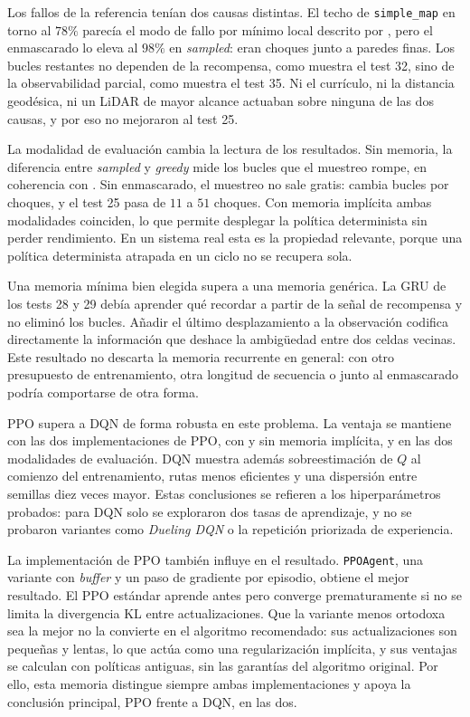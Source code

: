 Los fallos de la referencia tenían dos causas distintas. El
techo de \texttt{simple\_map} en torno al $78\%$ parecía el modo de
fallo por mínimo local descrito por \citet{gao2025hierarchical}, pero el
enmascarado lo eleva al $98\%$ en \textit{sampled}: eran choques junto a
paredes finas. Los bucles restantes no dependen de la recompensa, como
muestra el test 32, sino de la observabilidad parcial, como muestra el
test 35. Ni el currículo, ni la distancia geodésica, ni un LiDAR de
mayor alcance actuaban sobre ninguna de las dos causas, y por eso no
mejoraron al test 25.

La modalidad de evaluación cambia la lectura de los resultados.
Sin memoria, la diferencia entre \textit{sampled} y \textit{greedy} mide
los bucles que el muestreo rompe, en coherencia con
\citet{singh1994learning}. Sin enmascarado, el muestreo no sale gratis:
cambia bucles por choques, y el test 25 pasa de $11$ a $51$ choques. Con
memoria implícita ambas modalidades coinciden, lo que permite desplegar
la política determinista sin perder rendimiento. En un sistema real esta
es la propiedad relevante, porque una política determinista atrapada en
un ciclo no se recupera sola.

Una memoria mínima bien elegida supera a una memoria genérica.
La GRU de los tests 28 y 29 debía aprender qué recordar a partir de la
señal de recompensa y no eliminó los bucles. Añadir el último
desplazamiento a la observación codifica directamente la información que
deshace la ambigüedad entre dos celdas vecinas. Este resultado no
descarta la memoria recurrente en general: con otro presupuesto de
entrenamiento, otra longitud de secuencia o junto al enmascarado podría
comportarse de otra forma.

PPO supera a DQN de forma robusta en este problema. La ventaja
se mantiene con las dos implementaciones de PPO, con y sin memoria
implícita, y en las dos modalidades de evaluación. DQN muestra además
sobreestimación de $Q$ al comienzo del entrenamiento, rutas menos
eficientes y una dispersión entre semillas diez veces mayor. Estas
conclusiones se refieren a los hiperparámetros probados: para DQN solo se
exploraron dos tasas de aprendizaje, y no se probaron variantes como
\textit{Dueling DQN} o la repetición priorizada de experiencia.

La implementación de PPO también influye en el resultado.
\texttt{PPOAgent}, una variante
con \textit{buffer} y un paso de gradiente por episodio, obtiene el mejor
resultado. El PPO estándar aprende antes pero converge prematuramente si
no se limita la divergencia KL entre actualizaciones. Que la variante
menos ortodoxa sea la mejor no la convierte en el algoritmo recomendado:
sus actualizaciones son pequeñas y lentas, lo que actúa como una
regularización implícita, y sus ventajas se calculan con políticas
antiguas, sin las garantías del algoritmo original. Por ello, esta memoria
distingue siempre ambas implementaciones y apoya la conclusión principal,
PPO frente a DQN, en las dos.


